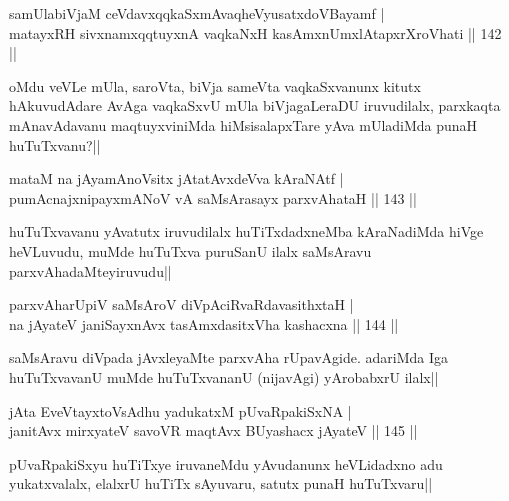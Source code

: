\begin{shl}
samUlabiVjaM ceVdavxqqkaSxmAvaqheVyusatxdoVBayamf |\\
matayxRH sivxnamxqqtuyxnA vaqkaNxH kasAmxnUmxlAtapxrXroVhati \hfill || 142 ||
\end{shl}

\begin{artha}
oMdu veVLe mUla, saroVta, biVja sameVta vaqkaSxvanunx kitutx hAkuvudAdare AvAga vaqkaSxvU mUla biVjagaLeraDU iruvudilalx, parxkaqta mAnavAdavanu maqtuyxviniMda hiMsisalapxTare yAva mUladiMda punaH huTuTxvanu?||
\end{artha}


\begin{shl}
mataM na jAyamAnoV\s sitx jAtatAvxdeVva kAraNAtf |\\
pumAcnajxnipayxmANoV vA saMsArasayx parxvAhataH \hfill || 143 ||
\end{shl}

\begin{artha}
huTuTxvavanu yAvatutx iruvudilalx huTiTxdadxneMba kAraNadiMda hiVge heVLuvudu, muMde huTuTxva puruSanU ilalx saMsAravu parxvAhadaMteyiruvudu||
\end{artha}

\begin{shl}
parxvAharUpiV saMsAroV diVpAciRvaRdavasithxtaH |\\
na jAyateV janiSayxnAvx tasAmxdasitxVha kashacxna \hfill || 144 ||
\end{shl}

\begin{artha}
saMsAravu diVpada jAvxleyaMte parxvAha rUpavAgide. adariMda Iga huTuTxvavanU muMde huTuTxvananU (nijavAgi) yArobabxrU ilalx||
\end{artha}%


\begin{shl}
jAta EveVtayxtoV\s sAdhu yadukatxM pUvaRpakiSxNA |\\
janitAvx mirxyateV savoVR maqtAvx BUyashacx jAyateV \hfill || 145 ||
\end{shl}

\begin{artha}
pUvaRpakiSxyu huTiTxye iruvaneMdu yAvudanunx heVLidadxno adu yukatxvalalx, elalxrU huTiTx sAyuvaru, satutx punaH huTuTxvaru||
\end{artha}

